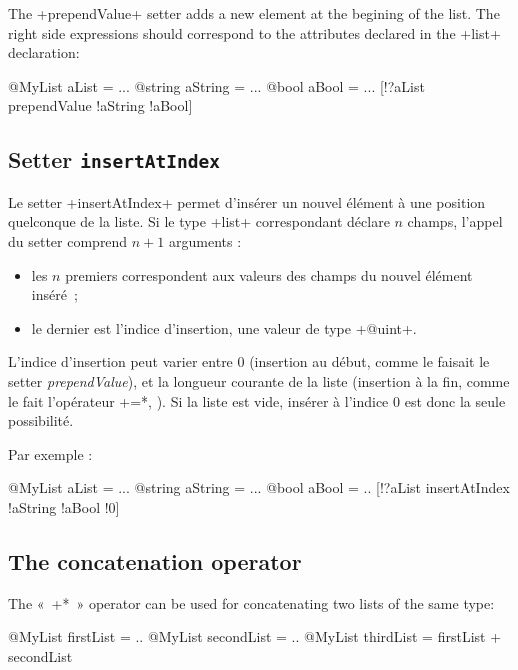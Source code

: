 The \ggsq+prependValue+ setter adds a new element at the begining of the list. The right side expressions should correspond to the attributes declared in the  \ggsq+list+ declaration:

\begin{galgas4}
@MyList aList = ...
@string aString = ...
@bool aBool = ...
[!?aList prependValue !aString !aBool]
\end{galgas4}




\subsection{Setter \texttt{insertAtIndex}}

Le setter \ggsq+insertAtIndex+ permet d'insérer un nouvel élément à une position quelconque de la liste. Si le type \ggsq+list+ correspondant déclare $n$ champs, l'appel du setter comprend $n+1$ arguments :
\begin{itemize}
  \item les $n$ premiers correspondent aux valeurs des champs du nouvel élément inséré~;
  \item le dernier est l'indice d'insertion, une valeur de type \ggsq+@uint+.
\end{itemize}

L'indice d'insertion peut varier entre $0$ (insertion au début, comme le faisait le setter \emph{prependValue}), et la longueur courante de la liste (insertion à la fin, comme le fait l'opérateur \ggsq*+=*, ). Si la liste est vide, insérer à l'indice $0$ est donc la seule possibilité.

Par exemple :

\begin{galgas4}
@MyList aList = ...
@string aString = ...
@bool aBool = ..
[!?aList insertAtIndex !aString !aBool !0]
\end{galgas4}

\subsection{The concatenation operator}

The «~\ggsq*+*~» operator can be used for concatenating two lists of the same type:


\begin{galgas4}
@MyList firstList = ..
@MyList secondList = ..
@MyList thirdList = firstList + secondList
\end{galgas4}


